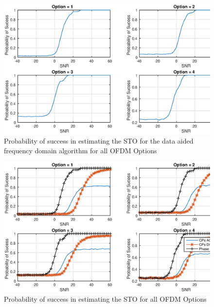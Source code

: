 \begin{figure}[hbt]
  \centering
    \includegraphics[width=1\textwidth]
      {./figures/p_sucess_sto_freq_ch0}
  \caption{Probability of success in estimating the STO for the data aided frequency domain algorithm for all OFDM Options}
  \label{fig:sto_esti_freq_rstl}
\end{figure}



\begin{figure}[hbt]
  \centering
    \includegraphics[width=1\textwidth]
      {./figures/p_sucess_sto}
  \caption{Probability of success in estimating the STO for all OFDM Options}
  \label{fig:sto_esti_all_rstl}
\end{figure}


